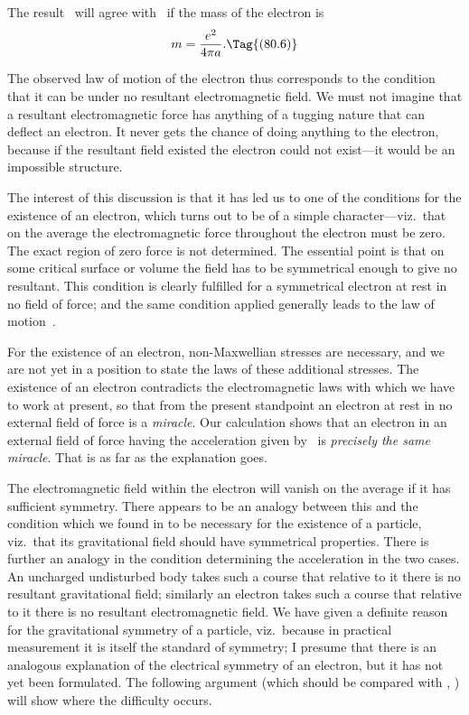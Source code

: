\documentclass[12pt]{book}
\begin{document}
The result~ will agree with~ if the mass of the electron is
\[
m = \frac{e^{2}}{4\pi a}.
\Tag{(80.6)}
\]

The observed law of motion of the electron thus corresponds to the condition
that it can be under no resultant electromagnetic field. We must not
imagine that a resultant electromagnetic force has anything of a tugging
nature that can deflect an electron. It never gets the chance of doing anything
to the electron, because if the resultant field existed the electron could not
exist---it would be an impossible structure.

The interest of this discussion is that it has led us to one of the conditions
for the existence of an electron, which turns out to be of a simple character---viz.\
that on the average the electromagnetic force throughout the electron
must be zero\footnotemark.\footnotetext
  {The exact region of zero force is not determined. The essential point is that on some critical
  surface or volume the field has to be symmetrical enough to give no resultant.}
This condition is clearly fulfilled for a symmetrical electron
at rest in no field of force; and the same condition applied generally leads to
the law of motion~\Eq{(80.1)}.

For the existence of an electron, non\hyp{}Maxwellian stresses are necessary,
and we are not yet in a position to state the laws of these additional stresses.
The existence of an electron contradicts the electromagnetic laws with which
we have to work at present, so that from the present standpoint an electron
at rest in no external field of force is a \emph{miracle}. Our calculation shows that an
electron in an external field of force having the acceleration given by~\Eq{(80.1)} is
\index{Electron!size of}%
\emph{precisely the same miracle}. That is as far as the explanation goes.

The electromagnetic field within the electron will vanish on the average
%
if it has sufficient symmetry. There appears to be an analogy between this
\index{Symmetry!of an electron}%
and the condition which we found in  to be necessary for the existence of
a particle, viz.\ that its gravitational field should have symmetrical properties.
There is further an analogy in the condition determining the acceleration in
the two cases. An uncharged undisturbed body takes such a course that
relative to it there is no resultant gravitational field; similarly an electron
takes such a course that relative to it there is no resultant electromagnetic
field. We have given a definite reason for the gravitational symmetry of a
particle, viz.\ because in practical measurement it is itself the standard of
symmetry; I presume that there is an analogous explanation of the electrical
symmetry of an electron, but it has not yet been formulated. The following
argument (which should be compared with \SecRefs{64}, \SecNum{66}) will show where the
difficulty occurs.
\end{document}
